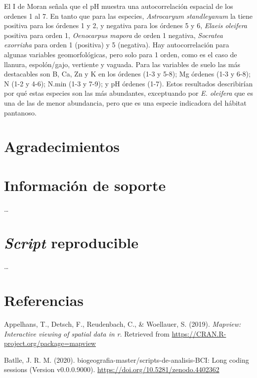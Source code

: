 \documentclass[11pt,]{article}
\begin{document}
El I de Moran señala que el pH muestra una autocorrelación espacial de
los ordenes 1 al 7. En tanto que para las especies, \emph{Astrocaryum
standleyanum} la tiene positiva para los órdenes 1 y 2, y negativa para
los órdenes 5 y 6, \emph{Elaeis oleifera} positiva para orden 1,
\emph{Oenocarpus mapora} de orden 1 negativa, \emph{Socratea exorrizha}
para orden 1 (positiva) y 5 (negativa). Hay autocorrelación para algunas
variables geomorfológicas, pero solo para 1 orden, como es el caso de
llanura, espolón/gajo, vertiente y vaguada. Para las variables de suelo
las más destacables son B, Ca, Zn y K en los órdenes (1-3 y 5-8); Mg
órdenes (1-3 y 6-8); N (1-2 y 4-6); N.min (1-3 y 7-9); y pH órdenes
(1-7). Estos resultados describirían por qué estas especies son las más
abundantes, exceptuando por \emph{E. oleifera} que es una de las de
menor abundancia, pero que es una especie indicadora del hábitat
pantanoso.

\section{Agradecimientos}\label{agradecimientos}

\section{Información de soporte}\label{informaciuxf3n-de-soporte}

\ldots

\section{\texorpdfstring{\emph{Script}
reproducible}{Script reproducible}}\label{script-reproducible}

\ldots

\section*{Referencias}\label{referencias}

\hypertarget{refs}{}
\hypertarget{ref-MapView}{}
Appelhans, T., Detsch, F., Reudenbach, C., \& Woellauer, S. (2019).
\emph{Mapview: Interactive viewing of spatial data in r}. Retrieved from
\url{https://CRAN.R-project.org/package=mapview}

\hypertarget{ref-jose_ramon_martinez_batlle_2020_4402362}{}
Batlle, J. R. M. (2020). biogeografia-master/scripts-de-analisis-BCI:
Long coding sessions (Version v0.0.0.9000).
\url{https://doi.org/10.5281/zenodo.4402362}
\end{document}
